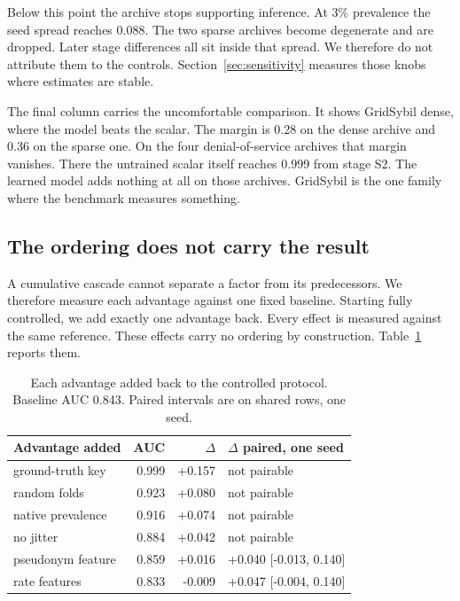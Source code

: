 \documentclass[conference]{IEEEtran}
\begin{document}
Below this point the archive stops supporting inference.
At 3\% prevalence the seed spread reaches 0.088.
The two sparse archives become degenerate and are dropped.
Later stage differences all sit inside that spread.
We therefore do not attribute them to the controls.
Section~\ref{sec:sensitivity} measures those knobs where estimates are stable.

The final column carries the uncomfortable comparison.
It shows GridSybil dense, where the model beats the scalar.
The margin is 0.28 on the dense archive and 0.36 on the sparse one.
On the four denial-of-service archives that margin vanishes.
There the untrained scalar itself reaches 0.999 from stage S2.
The learned model adds nothing at all on those archives.
GridSybil is the one family where the benchmark measures something.

\subsection{The ordering does not carry the result}
\label{sec:single}

A cumulative cascade cannot separate a factor from its predecessors.
We therefore measure each advantage against one fixed baseline.
Starting fully controlled, we add exactly one advantage back.
Every effect is measured against the same reference.
These effects carry no ordering by construction.
Table~\ref{tab:single} reports them.

\begin{table}[t]
\caption{Each advantage added back to the controlled protocol.
Baseline AUC 0.843. Paired intervals are on shared rows, one seed.}
\label{tab:single}
\centering
\footnotesize
\begin{tabular}{@{}lrrl@{}}
\toprule
Advantage added & AUC & $\Delta$ & $\Delta$ paired, one seed \\
\midrule
ground-truth key & 0.999 & +0.157 & not pairable \\
random folds & 0.923 & +0.080 & not pairable \\
native prevalence & 0.916 & +0.074 & not pairable \\
no jitter & 0.884 & +0.042 & not pairable \\
pseudonym feature & 0.859 & +0.016 & +0.040 [-0.013, 0.140] \\
rate features & 0.833 & -0.009 & +0.047 [-0.004, 0.140] \\
\bottomrule
\end{tabular}
\end{table}
\end{document}
